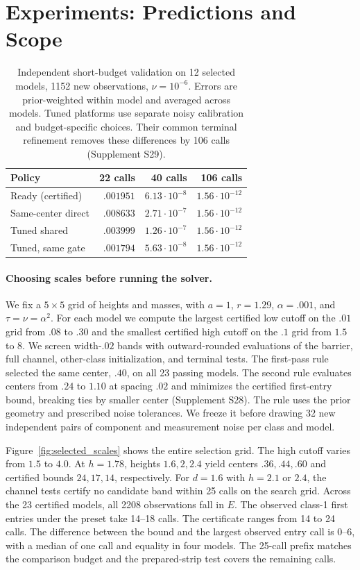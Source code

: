 \section{Experiments: Predictions and Scope}\label{sec:scope}
\begin{table}[t]
\centering\small
\setlength{\tabcolsep}{3.4pt}
\begin{tabular}{@{}lrrr@{}}
\toprule
Policy & 22 calls & 40 calls & 106 calls\\
\midrule
Ready (certified) & $.001951$ & $6.13\cdot10^{-8}$ & $1.56\cdot10^{-12}$\\
Same-center direct & $.008633$ & $2.71\cdot10^{-7}$ & $1.56\cdot10^{-12}$\\
Tuned shared & $.003999$ & $1.26\cdot10^{-7}$ & $1.56\cdot10^{-12}$\\
Tuned, same gate & $.001794$ & $5.63\cdot10^{-8}$ & $1.56\cdot10^{-12}$\\
\bottomrule
\end{tabular}
\caption{Independent short-budget validation on 12 selected models,
1152 new observations, $\nu=10^{-6}$. Errors are prior-weighted
within model and averaged across models. Tuned platforms use separate
noisy calibration and budget-specific choices. Their common terminal
refinement removes these differences by 106 calls (Supplement S29).}
\label{tab:budget_controls}
\end{table}

\paragraph{Choosing scales before running the solver.}
We fix a $5\times5$ grid of heights and masses, with
$a=1$, $r=1.29$, $\alpha=.001$, and $\tau=\nu=\alpha^2$.
For each model we compute the largest certified low cutoff
on the $.01$ grid from $.08$ to $.30$ and the smallest
certified high cutoff on the $.1$ grid from $1.5$ to $8$.
We screen width-$.02$ bands with outward-rounded evaluations
of the barrier, full channel, other-class initialization, and
terminal tests. The first-pass rule selected the same center,
$.40$, on all 23 passing models. The second rule evaluates
centers from $.24$ to $1.10$ at spacing $.02$ and minimizes
the certified first-entry bound, breaking ties by smaller
center (Supplement S28). The rule uses the prior geometry
and prescribed noise tolerances. We freeze it before drawing
32 new independent pairs of component and measurement noise
per class and model.

Figure~\ref{fig:selected_scales} shows the entire selection
grid. The high cutoff varies from $1.5$ to $4.0$. At $h=1.78$,
heights $1.6,2,2.4$ yield centers $.36,.44,.60$ and
certified bounds $24,17,14$, respectively.
For $d=1.6$ with $h=2.1$ or $2.4$, the channel tests certify
no candidate band within 25 calls on the search grid.
Across the 23 certified models, all 2208 observations fall in $E$.
The observed class-1 first entries under the preset take
14--18 calls. The certificate ranges from 14 to 24 calls.
The difference between the bound and the largest observed
entry call is 0--6, with a median of one call and equality
in four models. The 25-call prefix matches the comparison
budget and the prepared-strip test covers the remaining calls.

